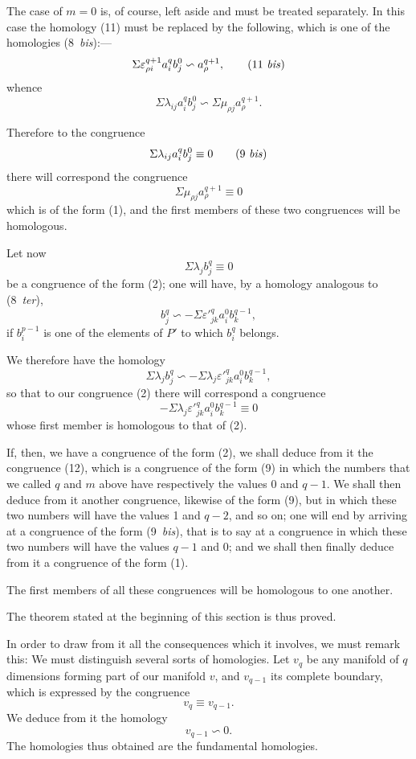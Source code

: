 \documentclass{article}
\begin{document}
The case of $m = 0$ is, of course, left aside and must be treated separately. In this case the homology (11) must be replaced by the following, which is one of the homologies (8~\emph{bis}):---
\[ \Sigma \varepsilon^{q+1}_{\rho i} a^{q}_{i} b^{0}_{j} \backsim a^{q+1}_{\rho}, \tag{11 \textit{bis}} \]
whence
\[ \Sigma \lambda_{ij} a^{q}_{i} b^{0}_{j} \backsim \Sigma \mu_{\rho j} a^{q+1}_{\rho}. \]

Therefore to the congruence
\[ \Sigma \lambda_{ij} a^{q}_{i} b^{0}_{j} \equiv 0 \tag{9 \textit{bis}} \]
there will correspond the congruence
\[ \Sigma \mu_{\rho j} a^{q+1}_{\rho} \equiv 0 \]
which is of the form (1), and the first members of these two congruences will be homologous.

Let now
\[ \Sigma \lambda_{j} b^{q}_{j} \equiv 0 \tag{2} \]
be a congruence of the form (2); one will have, by a homology analogous to (8~\emph{ter}),
\[ b^{q}_{j} \backsim -\Sigma \varepsilon'^{q}_{jk} a^{0}_{i} b^{q-1}_{k}, \]
if $b^{p-1}_{i}$ is one of the elements of $P'$ to which $b^{q}_{i}$ belongs.

We therefore have the homology
\[ \Sigma \lambda_{j} b^{q}_{j} \backsim -\Sigma \lambda_{j} \varepsilon'^{q}_{jk} a^{0}_{i} b^{q-1}_{k}, \]
so that to our congruence (2) there will correspond a congruence
\[ -\Sigma \lambda_{j} \varepsilon'^{q}_{jk} a^{0}_{i} b^{q-1}_{k} \equiv 0 \tag{12} \]
whose first member is homologous to that of (2).

If, then, we have a congruence of the form (2), we shall deduce from it the congruence (12), which is a congruence of the form (9) in which the numbers that we called $q$ and $m$ above have respectively the values 0 and $q-1$. We shall then deduce from it another
congruence, likewise of the form (9), but in which these two numbers will have the values 1 and $q-2$, and so on; one will end by arriving at a congruence of the form (9~\emph{bis}), that is to say at a congruence in which these two numbers will have the values $q-1$ and 0; and we shall then finally deduce from it a congruence of the form (1).

The first members of all these congruences will be homologous to one another.

The theorem stated at the beginning of this section is thus proved.

In order to draw from it all the consequences which it involves, we must remark this: We must distinguish several sorts of homologies. Let $v_{q}$ be any manifold of $q$ dimensions forming part of our manifold $v$, and $v_{q-1}$ its complete boundary, which is expressed by the congruence
\[ v_{q} \equiv v_{q-1}. \]
We deduce from it the homology
\[ v_{q-1} \backsim 0. \]
The homologies thus obtained are the fundamental homologies.
\end{document}
